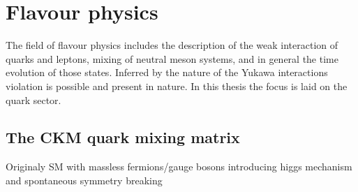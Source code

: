 
\section{Flavour physics}
\label{sec:cpv_theory:flavour_physics}

The field of flavour physics includes the description of the weak interaction of
quarks and leptons, mixing of neutral meson systems, and in general the time
evolution of those states. Inferred by the nature of the Yukawa interactions \CP
violation is possible and present in nature. In this thesis the focus is laid on
the quark sector.

\subsection{The \acs{CKM} quark mixing matrix}
\label{sec:cpv_theory:flavour_physics:ckm_matrix}

Originaly SM with massless fermions/gauge bosons
introducing higgs mechanism and spontaneous symmetry breaking

